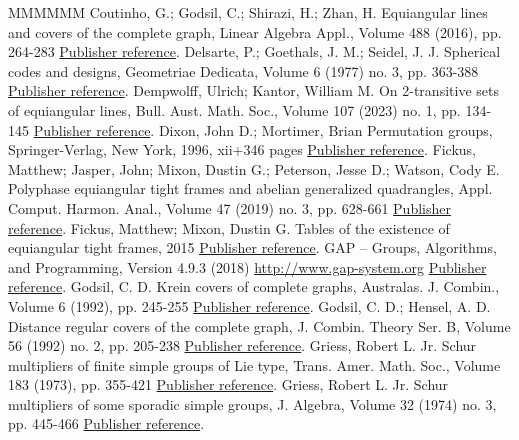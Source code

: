 \begin{thebibliography}{MMMMMM}
 Coutinho, G.; Godsil, C.; Shirazi, H.; Zhan, H. Equiangular lines and covers of the complete graph, Linear Algebra Appl., Volume 488 (2016), pp. 264-283 \href{https://alco.centre-mersenne.org/articles/10.5802/alco.324/#CoutinhoGSZ:16}{Publisher reference}.
 Delsarte, P.; Goethals, J. M.; Seidel, J. J. Spherical codes and designs, Geometriae Dedicata, Volume 6 (1977) no. 3, pp. 363-388 \href{https://alco.centre-mersenne.org/articles/10.5802/alco.324/#DelsarteGS:77}{Publisher reference}.
 Dempwolff, Ulrich; Kantor, William M. On 2-transitive sets of equiangular lines, Bull. Aust. Math. Soc., Volume 107 (2023) no. 1, pp. 134-145 \href{https://alco.centre-mersenne.org/articles/10.5802/alco.324/#DempwolffK:23}{Publisher reference}.
 Dixon, John D.; Mortimer, Brian Permutation groups, Springer-Verlag, New York, 1996, xii+346 pages \href{https://alco.centre-mersenne.org/articles/10.5802/alco.324/#DixonMortimer:96}{Publisher reference}.
 Fickus, Matthew; Jasper, John; Mixon, Dustin G.; Peterson, Jesse D.; Watson, Cody E. Polyphase equiangular tight frames and abelian generalized quadrangles, Appl. Comput. Harmon. Anal., Volume 47 (2019) no. 3, pp. 628-661 \href{https://alco.centre-mersenne.org/articles/10.5802/alco.324/#FickusJMPW:17}{Publisher reference}.
 Fickus, Matthew; Mixon, Dustin G. Tables of the existence of equiangular tight frames, 2015 \href{https://alco.centre-mersenne.org/articles/10.5802/alco.324/#FickusMixon:table}{Publisher reference}.
 GAP – Groups, Algorithms, and Programming, Version 4.9.3 (2018) \url{http://www.gap-system.org} \href{https://alco.centre-mersenne.org/articles/10.5802/alco.324/#GAP}{Publisher reference}.
 Godsil, C. D. Krein covers of complete graphs, Australas. J. Combin., Volume 6 (1992), pp. 245-255 \href{https://alco.centre-mersenne.org/articles/10.5802/alco.324/#Godsil:92}{Publisher reference}.
 Godsil, C. D.; Hensel, A. D. Distance regular covers of the complete graph, J. Combin. Theory Ser. B, Volume 56 (1992) no. 2, pp. 205-238 \href{https://alco.centre-mersenne.org/articles/10.5802/alco.324/#GodsilHensel:92}{Publisher reference}.
 Griess, Robert L. Jr. Schur multipliers of finite simple groups of Lie type, Trans. Amer. Math. Soc., Volume 183 (1973), pp. 355-421 \href{https://alco.centre-mersenne.org/articles/10.5802/alco.324/#Griess:73}{Publisher reference}.
 Griess, Robert L. Jr. Schur multipliers of some sporadic simple groups, J. Algebra, Volume 32 (1974) no. 3, pp. 445-466 \href{https://alco.centre-mersenne.org/articles/10.5802/alco.324/#Griess:74}{Publisher reference}.

\end{thebibliography}
